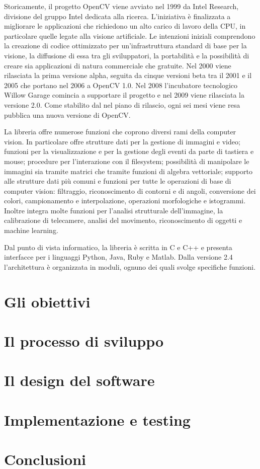 				Storicamente, il progetto OpenCV viene avviato nel 1999 da Intel Research, divisione del gruppo Intel dedicata alla ricerca. 
				L'iniziativa è finalizzata a migliorare le applicazioni che richiedono un alto carico di lavoro della CPU, in particolare quelle legate alla visione artificiale. 
				Le intenzioni iniziali comprendono la creazione di codice ottimizzato per un'infrastruttura standard di base per la visione, la diffusione di essa tra gli sviluppatori, la portabilità e la possibilità di creare sia applicazioni di natura commerciale che gratuite. 
				Nel 2000 viene rilasciata la prima versione alpha, seguita da cinque versioni beta tra il 2001 e il 2005 che portano nel 2006 a OpenCV 1.0.	
				Nel 2008 l'incubatore tecnologico Willow Garage comincia a supportare il progetto e nel 2009 viene rilasciata la versione 2.0. 
				Come stabilito dal nel piano di rilascio, ogni sei mesi viene resa pubblica una nuova versione di OpenCV.

				La libreria offre numerose funzioni che coprono diversi rami della computer vision.
				In particolare offre strutture dati per la gestione di immagini e video; funzioni per la visualizzazione e per la gestione degli eventi da parte di tastiera e mouse; procedure per l'interazione con il filesystem; possibilità di manipolare le immagini sia tramite matrici che tramite funzioni di algebra vettoriale; supporto alle strutture dati più comuni e funzioni per tutte le operazioni di base di computer vision: filtraggio, riconoscimento di contorni e di angoli, conversione dei colori, campionamento e interpolazione, operazioni morfologiche e istogrammi.
				Inoltre integra molte funzioni per l'analisi strutturale dell'immagine, la calibrazione di telecamere, analisi del movimento, riconoscimento di oggetti e machine learning.
				
				Dal punto di vista informatico, la libreria è scritta in C e C++ e presenta interfacce per i linguaggi Python, Java, Ruby e Matlab.
				Dalla versione 2.4 l'architettura è organizzata in moduli, ognuno dei quali svolge specifiche funzioni. 
				


	\section*{Gli obiettivi}


	\section*{Il processo di sviluppo}


	\section*{Il design del software}


	\section*{Implementazione e testing}
	

	\section*{Conclusioni}

